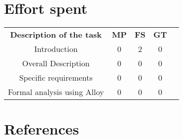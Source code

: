 \documentclass{article}
\begin{document}
\newpage
\section{Effort spent}
\begin{center}
    \begin{tabular}{c|c|c|c|c}
        \hline
        \textbf{Description of the task} & \textbf{MP} & \textbf{FS} & \textbf{GT} \\
        Introduction                    & 0 & 2 & 0 \\
        Overall Description             & 0 & 0 & 0 \\
        Specific requirements           & 0 & 0 & 0 \\
        Formal analysis using Alloy     & 0 & 0 & 0 \\
    \end{tabular}
\end{center}
\section{References}
    
\end{document}
